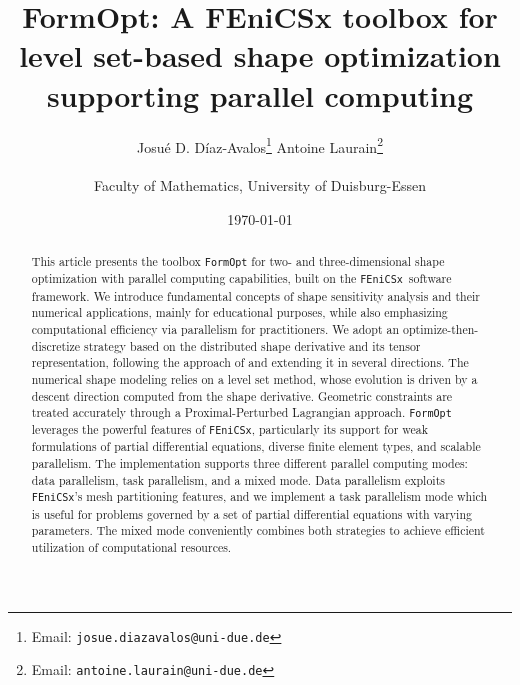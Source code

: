 \documentclass[a4paper, oneside]{article}
\title{FormOpt: A FEniCSx toolbox for level set-based shape optimization supporting parallel computing}
\author{
	Josu\'{e} D. D\'{i}az-Avalos\thanks{Email: \texttt{josue.diazavalos@uni-due.de}} \qquad
	Antoine Laurain\thanks{Email: \texttt{antoine.laurain@uni-due.de}} \\
	\\
	Faculty of Mathematics, University of Duisburg-Essen
}
\date{\today}
\newcommand{\fopt}{\texttt{FormOpt} }
\newcommand{\fx}{\texttt{FEniCSx}}
\begin{document}
\maketitle

\begin{abstract}
	This article presents the toolbox \fopt for two- and three-dimensional shape optimization with parallel computing capabilities, built on the \fx\,  software framework. 
	We introduce fundamental concepts of shape sensitivity analysis and their numerical applications, mainly for educational purposes, while also emphasizing computational efficiency via parallelism for practitioners.
	We adopt an optimize-then-discretize strategy based on the distributed shape derivative and its tensor representation, following the approach of \cite{MR3843884} and extending it in several directions.
The numerical shape modeling relies on  a level set method, whose evolution is driven by a descent direction computed from the shape derivative.
Geometric constraints are treated accurately through a Proximal-Perturbed Lagrangian approach.
\fopt leverages the powerful features of  \fx, particularly its support for weak formulations of partial differential equations, diverse finite element types, and scalable parallelism.
The implementation supports three different parallel computing modes: data parallelism, task parallelism, and a mixed mode. Data parallelism exploits \fx's mesh partitioning features, and we implement a task parallelism mode which is useful for problems governed by a set of partial differential equations with varying parameters. The mixed mode conveniently combines both strategies to achieve efficient utilization of computational resources.
\end{abstract}
\end{document}
